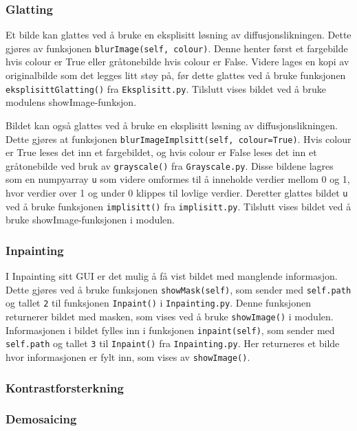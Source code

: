 \subsubsection{Glatting}
Et bilde kan glattes ved å bruke en eksplisitt løsning av diffusjonslikningen. Dette gjøres av funksjonen \texttt{blurImage(self, colour)}. Denne henter først et fargebilde hvis colour er True eller gråtonebilde hvis colour er False. Videre lages en kopi av originalbilde som det legges litt støy på, før dette glattes ved å bruke funksjonen \texttt{eksplisittGlatting()} fra \texttt{Eksplisitt.py}. Tilslutt vises bildet ved å bruke modulens showImage-funksjon.

Bildet kan også glattes ved å bruke en eksplisitt løsning av diffusjonslikningen. Dette gjøres at funksjonen \texttt{blurImageImplsitt(self, colour=True)}. Hvis colour er True leses det inn et fargebildet, og hvis colour er False leses det inn et gråtonebilde ved bruk av \texttt{grayscale()} fra \texttt{Grayscale.py}. Disse bildene lagres som en numpyarray \texttt{u} som videre omformes til å inneholde verdier mellom 0 og 1, hvor verdier over 1 og under 0 klippes til lovlige verdier. Deretter glattes bildet \texttt{u} ved å bruke funksjonen \texttt{implisitt()} fra \texttt{implisitt.py}. Tilslutt vises bildet ved å bruke showImage-funksjonen i modulen.

\subsubsection{Inpainting}
I Inpainting sitt GUI er det mulig å få vist bildet med manglende informasjon. Dette gjøres ved å bruke funksjonen \texttt{showMask(self)}, som sender med \texttt{self.path} og tallet \texttt{2} til funksjonen \texttt{Inpaint()} i \texttt{Inpainting.py}. Denne funksjonen returnerer bildet med masken, som vises ved å bruke \texttt{showImage()} i modulen. Informasjonen i bildet fylles inn i funksjonen \texttt{inpaint(self)}, som sender med \texttt{self.path} og tallet \texttt{3} til \texttt{Inpaint()} fra \texttt{Inpainting.py}. Her returneres et bilde hvor informasjonen er fylt inn, som vises av \texttt{showImage()}. 

\subsubsection{Kontrastforsterkning}


\subsubsection{Demosaicing}


